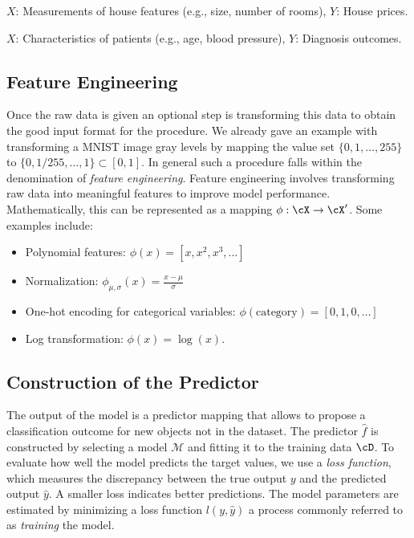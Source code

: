 \begin{example}
$X$: Measurements of house features (e.g., size, number of
rooms), $Y$: House prices.
\end{example}

\begin{example}
$X$: Characteristics of patients (e.g., age, blood pressure), $Y$:
Diagnosis outcomes.
\end{example}

\subsection{Feature Engineering}
\label{sec:ch1-features}

Once the raw data is given an optional step is transforming this data to obtain
the good input format for the procedure. We already gave an example with transforming a MNIST image gray levels by mapping the value set
$\{0, 1, \ldots, 255\}$ to $\{0, 1/255, \ldots, 1\} \subset [0,1]$. In general such a procedure falls
within the denomination of \emph{feature engineering}. Feature engineering involves
transforming raw data into meaningful features to improve model performance.
Mathematically, this can be represented as a mapping $\phi : \cX \to \cX'$. Some examples include:
\begin{itemize}
  \item Polynomial features: $\phi(x) = [x, x^2, x^3, \ldots]$
  \item Normalization: $\phi_{\mu,\sigma}(x) = \frac{x-\mu}{\sigma}$
  \item One-hot encoding for categorical variables: $\phi(\text{category}) = [0, 1, 0, \ldots]$
  \item Log transformation: $\phi(x) = \log(x)$.
\end{itemize}

\subsection{Construction of the Predictor}
\label{sec:ch1-predictor}

The output of the model is a predictor mapping that allows to propose a
classification outcome for new objects not in the dataset. The predictor $\hat{f}$ is
constructed by selecting a model $\mathcal{M}$ and fitting it to the training data $\cD$. To
evaluate how well the model predicts the target values, we use a \emph{loss function},
which measures the discrepancy between the true output $y$ and the predicted
output $\hat{y}$. A smaller loss indicates better predictions. The model parameters
are estimated by minimizing a loss function $l(y, \hat{y})$ a process commonly referred
to as \emph{training} the model.

